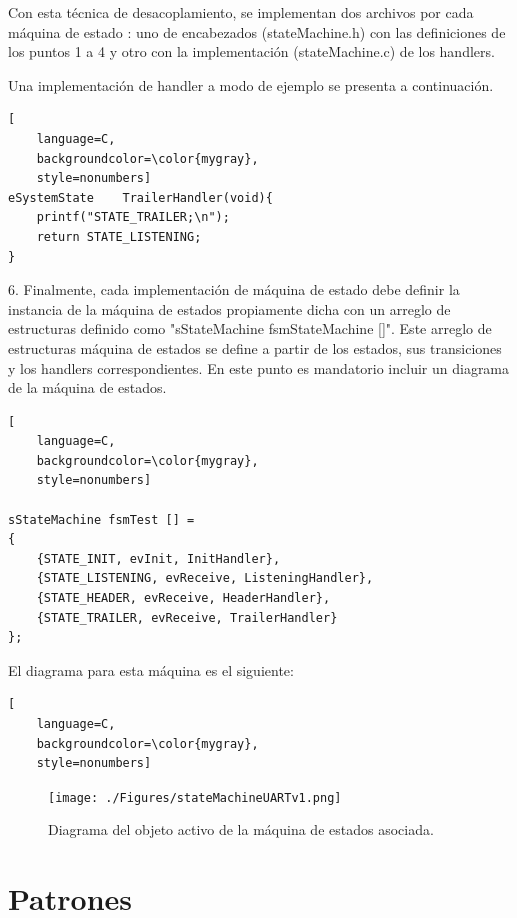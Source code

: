 Con esta técnica de desacoplamiento, se implementan dos archivos por cada máquina de estado : uno de encabezados (stateMachine.h) con las definiciones de los puntos 1 a 4 y otro con la implementación (stateMachine.c) de los handlers.

Una implementación de handler a modo de ejemplo se presenta a continuación.

\begin{lstlisting}[
	language=C, 
	backgroundcolor=\color{mygray},
	style=nonumbers]
eSystemState 	TrailerHandler(void){ 
	printf("STATE_TRAILER;\n");
	return STATE_LISTENING; 
}
\end{lstlisting}

6. Finalmente, cada implementación de máquina de estado debe definir la instancia de la máquina de estados propiamente dicha con un arreglo de estructuras definido como "sStateMachine fsmStateMachine []". Este arreglo de estructuras máquina de estados se define a partir de los estados, sus transiciones y los handlers correspondientes. En este punto es mandatorio incluir un diagrama de la máquina de estados.

\begin{lstlisting}[
	language=C, 
	backgroundcolor=\color{mygray},
	style=nonumbers]

sStateMachine fsmTest [] = 
{
	{STATE_INIT, evInit, InitHandler},
	{STATE_LISTENING, evReceive, ListeningHandler},
	{STATE_HEADER, evReceive, HeaderHandler},
	{STATE_TRAILER, evReceive, TrailerHandler}
};
\end{lstlisting}


El diagrama para esta máquina es el siguiente:

\begin{lstlisting}[
	language=C, 
	backgroundcolor=\color{mygray},
	style=nonumbers]
\end{lstlisting}


\begin{figure}[ht]
	\centering
	\texttt{[image: ./Figures/stateMachineUARTv1.png]}
	\caption{Diagrama del objeto activo de la máquina de estados asociada.}
	\label{fig:fsmUARTv1}
\end{figure}

	
\pagebreak
\section{Patrones}



